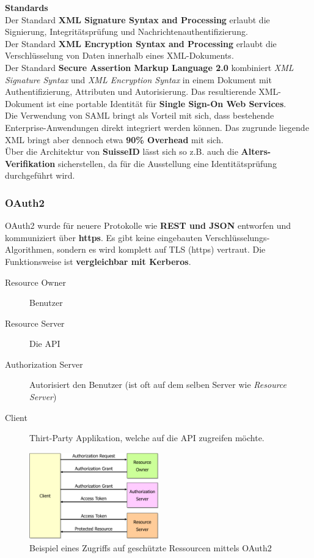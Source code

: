 \textbf{Standards}\\
Der Standard \textbf{XML Signature Syntax and Processing} erlaubt die Signierung, Integritätsprüfung und Nachrichtenauthentifizierung.\\
Der Standard \textbf{XML Encryption Syntax and Processing} erlaubt die Verschlüsselung von Daten innerhalb eines XML-Dokuments.\\
Der Standard \textbf{Secure Assertion Markup Language 2.0} kombiniert \textit{XML Signature Syntax} und \textit{XML Encryption Syntax} in einem Dokument mit Authentifizierung, Attributen und Autorisierung. Das resultierende XML-Dokument ist eine portable Identität für \textbf{Single Sign-On Web Services}.\\
Die Verwendung von SAML bringt als Vorteil mit sich, dass bestehende Enterprise-Anwendungen direkt integriert werden können. Das zugrunde liegende XML bringt aber dennoch etwa \textbf{90\% Overhead} mit sich.\\

Über die Architektur von \textbf{SuisseID} lässt sich so z.B. auch die \textbf{Alters-Verifikation} sicherstellen, da für die Ausstellung eine Identitätsprüfung durchgeführt wird.

\subsubsection{OAuth2}
OAuth2 wurde für neuere Protokolle wie \textbf{REST und JSON} entworfen und kommuniziert über \textbf{https}. Es gibt keine eingebauten Verschlüsselungs-Algorithmen, sondern es wird komplett auf TLS (https) vertraut. Die Funktionsweise ist \textbf{vergleichbar mit Kerberos}.

\begin{description}
	\item[Resource Owner] Benutzer
	\item[Resource Server] Die API
	\item[Authorization Server] Autorisiert den Benutzer (ist oft auf dem selben Server wie \textit{Resource Server})
	\item[Client] Thirt-Party Applikation, welche auf die API zugreifen möchte.
\end{description}

\begin{figure}[H]
	\centering
	\includegraphics[width=0.5\textwidth]{./img/oauth2-example}
	\caption{Beispiel eines Zugriffs auf geschützte Ressourcen mittels OAuth2}
\end{figure}

